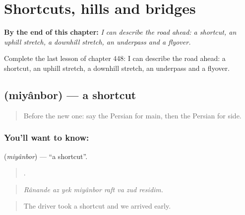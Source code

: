 
\chapter{Shortcuts, hills and bridges}
\label{ch:fa-shortcuts-hills-and-bridges}

\begin{chapteropening}
\textbf{By the end of this chapter:} \emph{I can describe the road ahead: a shortcut, an uphill stretch, a downhill stretch, an underpass and a flyover.}

Complete the last lesson of chapter 448: I can describe the road ahead: a shortcut, an uphill stretch, a downhill stretch, an underpass and a flyover.
\end{chapteropening}

\section[\texorpdfstring{\fa{میانبر} (miyânbor)}{میانبر (miyânbor)}]{ (miyânbor) — a shortcut}

\label{lesson:FA-C448-miyanbor}



\begin{quote}
Before the new one: say the Persian for main, then the Persian for side.
\end{quote}

\subsection*{You'll want to know: }
\textbf{} (\emph{miyânbor}) — \textquotedblleft{}a shortcut\textquotedblright{}.

\begin{quote}
       .
\end{quote}

\begin{quote}
\emph{Rânande az yek miyânbor raft va zud residim.}
\end{quote}

\begin{quote}
The driver took a shortcut and we arrived early.
\end{quote}

